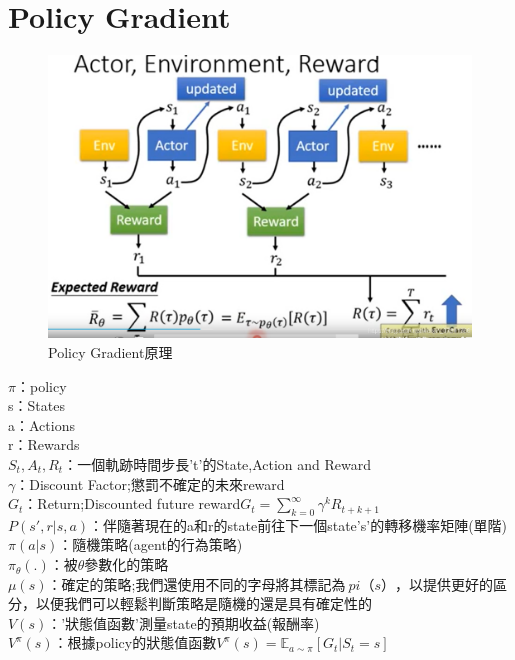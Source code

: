 \documentclass[14pt,a4paper]{report}  %
\begin{document}
\section{Policy Gradient}
\begin{figure}[hbt!]
\begin{center}
\includegraphics[width=15cm]{policy gradient原理}
\caption{\Large Policy Gradient原理}
\label{Policy Gradient原理}
\end{center}
\end{figure}
\hspace{-1.5em}$\pi$：policy\\
s：States\\
a：Actions\\
r：Rewards\\
$S_t,A_t,R_t$：一個軌跡時間步長't'的State,Action and Reward \\
$\gamma$：Discount Factor;懲罰不確定的未來reward\\
$G_t$：Return;Discounted future reward$G_t = \sum_{k=0}^{\infty} \gamma^k R_{t+k+1}$\\
$P(s', r \vert s, a)$：伴隨著現在的a和r的state前往下一個state's'的轉移機率矩陣(單階)\\
$\pi(a \vert s)$：隨機策略(agent的行為策略)\\
$\pi_\theta(.)$：被$\theta$參數化的策略\\
$\mu(s)$：確定的策略;我們還使用不同的字母將其標記為$ \ pi（s）$，以提供更好的區分，以便我們可以輕鬆判斷策略是隨機的還是具有確定性的\\
$V(s)$：'狀態值函數'測量state的預期收益(報酬率)\\
$V^\pi(s)$：根據policy的狀態值函數$V^\pi (s) = \mathbb{E}_{a\sim \pi} [G_t \vert S_t = s]$\\
\end{document}
